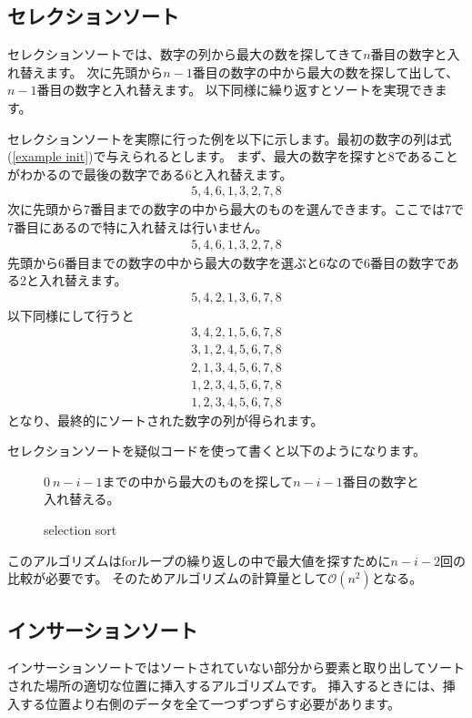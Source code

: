 \documentclass[dvipdfmx,pic,eepic,ecltree]{jarticle}
\begin{document}
\subsection{セレクションソート}
セレクションソートでは、数字の列から最大の数を探してきて$n$番目の数字と入れ替えます。
次に先頭から$n-1$番目の数字の中から最大の数を探して出して、$n-1$番目の数字と入れ替えます。
以下同様に繰り返すとソートを実現できます。

セレクションソートを実際に行った例を以下に示します。最初の数字の列は式(\ref{example init})で与えられるとします。
まず、最大の数字を探すと$8$であることがわかるので最後の数字である6と入れ替えます。
\begin{eqnarray}
5, 4, 6, 1, 3, 2, 7, 8
\end{eqnarray}
次に先頭から7番目までの数字の中から最大のものを選んできます。ここでは7で7番目にあるので特に入れ替えは行いません。
\begin{eqnarray}
5, 4, 6, 1, 3, 2, 7, 8
\end{eqnarray}
先頭から6番目までの数字の中から最大の数字を選ぶと6なので6番目の数字である2と入れ替えます。
\begin{eqnarray}
5, 4, 2, 1, 3, 6, 7, 8
\end{eqnarray}
以下同様にして行うと
\begin{eqnarray}
3, 4, 2, 1, 5, 6, 7, 8\\
3, 1, 2, 4, 5, 6, 7, 8\\
2, 1, 3, 4, 5, 6, 7, 8\\
1, 2, 3, 4, 5, 6, 7, 8\\
1, 2, 3, 4, 5, 6, 7, 8
\end{eqnarray}
となり、最終的にソートされた数字の列が得られます。

セレクションソートを疑似コードを使って書くと以下のようになります。
\begin{figure}[H]
\begin{algorithm}[H]
	\caption{selection sort}
	\label{selection sort}
	\begin{algorithmic}[1]  
    	\STATE $0~n-i-1$までの中から最大のものを探して$n-i-1$番目の数字と入れ替える。
	\ENDFOR
	\end{algorithmic}
\end{algorithm}
\end{figure}
このアルゴリズムはforループの繰り返しの中で最大値を探すために$n-i-2$回の比較が必要です。
そのためアルゴリズムの計算量として$\mathcal{O}(n^{2})$となる。
\subsection{インサーションソート}
インサーションソートではソートされていない部分から要素と取り出してソートされた場所の適切な位置に挿入するアルゴリズムです。
挿入するときには、挿入する位置より右側のデータを全て一つずつずらす必要があります。
\end{document}
